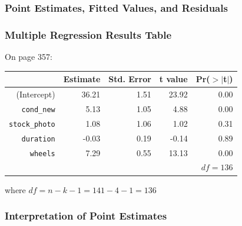 \documentclass[handout]{beamer}
\newcommand{\blue}[1]{\textcolor{blue2}{#1}}
\begin{document}
\begin{frame}[fragile]
\frametitle{Point Estimates, Fitted Values, and Residuals}
%
%
\end{frame}


\begin{frame}[fragile]
\frametitle{Multiple Regression Results Table}

On page 357:
\begin{table}[ht]
\centering
\begin{tabular}{r|rrrr}
  \hline
 & Estimate & Std. Error & t value & Pr($>$$|$t$|$) \\ 
  \hline
(Intercept) & 36.21 & 1.51 & 23.92 & 0.00 \\ 
{\tt cond\_new} & 5.13 & 1.05 & 4.88 & 0.00 \\ 
{\tt stock\_photo} & 1.08 & 1.06 & 1.02 & 0.31 \\ 
{\tt duration} & -0.03 & 0.19 & -0.14 & 0.89 \\ 
{\tt wheels} & 7.29 & 0.55 & 13.13 & 0.00 \\ 
   \hline
   & & & & $df=136$\\
\end{tabular}
\end{table}
where $df=n-k-1=141-4-1=136$
\end{frame}


\begin{frame}[fragile]
\frametitle{Interpretation of Point Estimates}


\end{frame}
\end{document}
